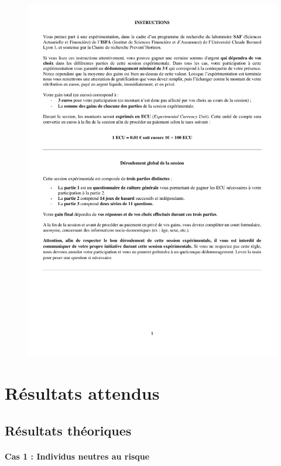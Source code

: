 \begin{Article}
\begin{refsection}[Mouminoux]
\begin{appendices}
\begin{figure}[htbp]
  \centering
  \includegraphics[page=6,scale=0.6]{06_Protocole.pdf}
\end{figure}

\newpage

\section{Résultats attendus}
\label{Annexe:Expected_results}

\subsection{Résultats théoriques}
\label{Annexe:Expected_results_theo}

\paragraph*{Cas 1 : Individus neutres au risque}


\end{appendices}
\end{refsection}
\end{Article}

